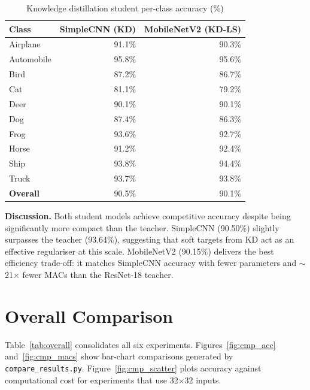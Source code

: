 \documentclass[12pt,a4paper]{article}
\begin{document}
\begin{table}[H]
  \centering
  \caption{Knowledge distillation student per-class accuracy (\%)}
  \label{tab:kd_perclass}
  \begin{tabular}{lrr}
    \toprule
    Class & SimpleCNN (KD) & MobileNetV2 (KD-LS) \\
    \midrule
  Airplane & 91.1\% & 90.3\% \\
  Automobile & 95.8\% & 95.6\% \\
  Bird & 87.2\% & 86.7\% \\
  Cat & 81.1\% & 79.2\% \\
  Deer & 90.1\% & 90.1\% \\
  Dog & 87.4\% & 86.3\% \\
  Frog & 93.6\% & 92.7\% \\
  Horse & 91.2\% & 92.4\% \\
  Ship & 93.8\% & 94.4\% \\
  Truck & 93.7\% & 93.8\% \\
    \midrule
    \textbf{Overall} & 90.5\% & 90.1\% \\
    \bottomrule
  \end{tabular}
\end{table}

\textbf{Discussion.} Both student models achieve competitive accuracy despite being significantly more compact than the teacher. SimpleCNN (90.50\%) slightly surpasses the teacher (93.64\%), suggesting that soft targets from KD act as an effective regulariser at this scale. MobileNetV2 (90.15\%) delivers the best efficiency trade-off: it matches SimpleCNN accuracy with fewer parameters and $\sim$21$\times$ fewer MACs than the ResNet-18 teacher.

\newpage

\section{Overall Comparison}

Table~\ref{tab:overall} consolidates all six experiments. Figures~\ref{fig:cmp_acc} and~\ref{fig:cmp_macs} show bar-chart comparisons generated by \texttt{compare\_results.py}. Figure~\ref{fig:cmp_scatter} plots accuracy against computational cost for experiments that use 32$\times$32 inputs.
\end{document}
